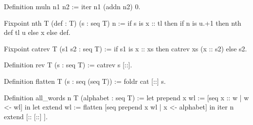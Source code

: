 \begin{Answer}[ref=ex:itermul]

\begin{coq}{}{}
Definition muln n1 n2 := iter n1 (addn n2) 0.
\end{coq}

\end{Answer}

\begin{Answer}[ref=ex:nth]

\begin{coq}{}{}
Fixpoint nth T (def : T) (s : seq T) n :=
  if s is x :: tl then if n is u.+1 then nth def tl u else x else def.
\end{coq}

\end{Answer}

\begin{Answer}[ref=ex:rev]

\begin{coq}{}{}
Fixpoint catrev T (s1 s2 : seq T) :=
  if s1 is x :: xs then catrev xs (x :: s2) else s2.

Definition rev T (s : seq T) := catrev s [::].
\end{coq}

\end{Answer}


\begin{Answer}[ref=ex:flatten]

\begin{coq}{}{}
Definition flatten T (s : seq (seq T)) := foldr cat [::] s.
\end{coq}

\end{Answer}

\begin{Answer}[ref=ex:allwords]

\begin{coq}{}{}
Definition all_words n T (alphabet : seq T) :=
  let prepend x wl := [seq x :: w | w <- wl] in
  let extend wl := flatten [seq prepend x wl | x <- alphabet] in
  iter n extend [:: [::] ].
\end{coq}

\end{Answer}



